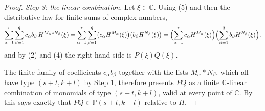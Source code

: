 \begin{proof}
\emph{Step 3: the linear combination.}  Let $\xi\in\mathbb{C}$.  Using (5) and
then the distributive law for finite sums of complex numbers,
\[
  \sum_{\alpha=1}^{r}\sum_{\beta=1}^{q}c_\alpha b_\beta\,H^{M_\alpha * N_\beta}(\xi)
  =\sum_{\alpha=1}^{r}\sum_{\beta=1}^{q}
     \bigl(c_\alpha H^{M_\alpha}(\xi)\bigr)\bigl(b_\beta H^{N_\beta}(\xi)\bigr)
  =\Bigl(\sum_{\alpha=1}^{r}c_\alpha H^{M_\alpha}(\xi)\Bigr)
   \Bigl(\sum_{\beta=1}^{q}b_\beta H^{N_\beta}(\xi)\Bigr),
\]
and by (2) and (4) the right-hand side is $P(\xi)Q(\xi)$.

The finite family of coefficients $c_\alpha b_\beta$ together with the lists
$M_\alpha * N_\beta$, which all have type $(s+t,k+l)$ by Step 1, therefore
presents $PQ$ as a finite $\mathbb{C}$-linear combination of monomials of type
$(s+t,k+l)$, valid at every point of $\mathbb{C}$.  By  this
says exactly that $PQ\in\mathbb{P}(s+t,k+l)$ relative to $H$.
\end{proof}
